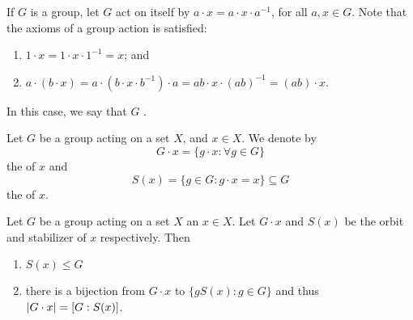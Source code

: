 \begin{eg}\label{eg:group_action_by_conjugation}
  If $G$ is a group, let $G$ act on itself by $a \cdot x = a \cdot x \cdot a^{-1}$, for all $a, x \in G$. Note that the axioms of a group action is satisfied:
  \begin{enumerate}
    \item $1 \cdot x = 1 \cdot x \cdot 1^{-1} = x$; and
    \item $a \cdot (b \cdot x) = a \cdot ( b \cdot x \cdot b^{-1} ) \cdot a = ab \cdot x \cdot (ab)^{-1} = (ab) \cdot x$.
  \end{enumerate}
  In this case, we say that $G$  .
\end{eg}

\begin{defn}
\label{defn:orbit_n_stabilizer}
  Let $G$ be a group acting on a set $X$, and $x \in X$. We denote by
  \begin{equation*}
    G \cdot x = \{g \cdot x : \forall g \in G \}
  \end{equation*}
  the  of $x$ and
  \begin{equation*}
    S(x) = \{g \in G : g \cdot x = x \} \subseteq G
  \end{equation*}
  the  of $x$.
\end{defn}

\begin{propo}
\label{propo:stabilizer_is_a_subgroup_and_index_of_stabilizer_is_order_of_orbit}
  Let $G$ be a group acting on a set $X$ an $x \in X$. Let $G \cdot x$ and $S(x)$ be the orbit and stabilizer of $x$ respectively. Then
  \begin{enumerate}
    \item $S(x) \leq G$
    \item there is a bijection from $G \cdot x$ to $\{g S(x) : g \in G \}$ and thus $\left|G \cdot x\right| = [G : S(x)]$.
  \end{enumerate}
\end{propo}

